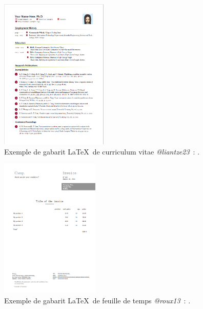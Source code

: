 \documentclass[
  letterpaper,
]{scrbook}
\begin{document}
\begin{figure}

{\centering \includegraphics[width=2.02in,height=\textheight]{images/chapitre5_CVtemp.png}

}

\caption{\label{fig-cv}Exemple de gabarit \LaTeX~de curriculum vitae
\newline \textit{@liantze23}~: .}

\end{figure}

\begin{figure}

{\centering \includegraphics[width=1.85in,height=\textheight]{images/chapitre5_TStemp.png}

}

\caption{\label{fig-invoice}Exemple de gabarit \LaTeX~de feuille de
temps \newline \textit{@roux13}~: .}

\end{figure}
\end{document}
